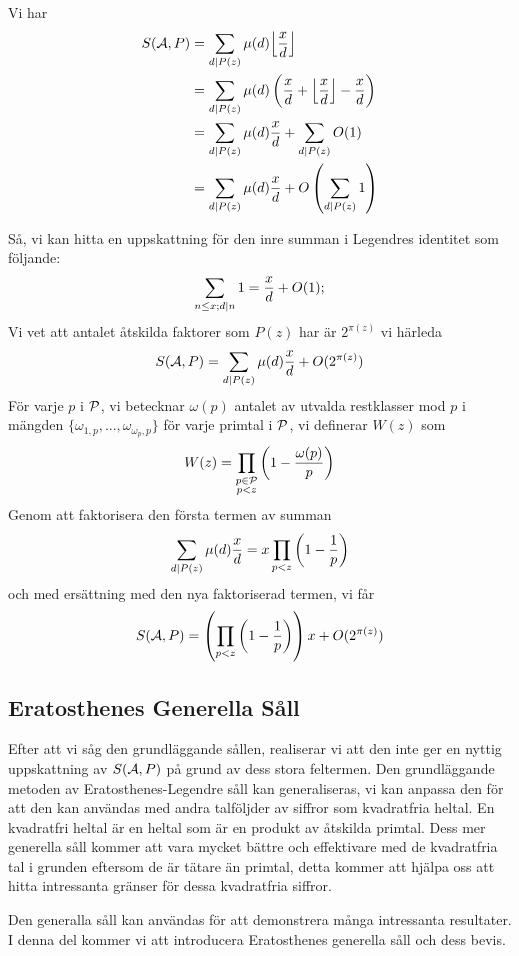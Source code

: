 Vi har
\begin{align*}
S(\A, P) & =\sum_{d\divides P(z)}\mu(d)\Bigl\lfloor \frac{x}{d}\Bigr\rfloor\\
 &  =\sum_{d\divides P(z)}\mu(d) \left( \frac{x}{d}+ \Bigl\lfloor \frac{x}{d} \Bigr\rfloor - \frac{x}{d} \right)\\
 & =\sum_{d\divides P(z)}\mu(d)\frac{x}{d}+\sum_{d\divides P(z)}O(1)\\
 & =\sum_{d\divides P(z)}\mu(d)\frac{x}{d}+ O\left(\sum_{d\divides P(z)}1\right)
\end{align*}

Så, vi kan hitta en uppskattning för den inre summan i Legendres identitet som följande:
\[\sum_{n\leq x;d\divides n}1=\frac{x}{d}+O(1); \]
Vi vet att antalet åtskilda faktorer som $ P(z) $ har är $ 2^{\pi(z)} $ vi härleda
\[S(\A, P)=\sum_{d\divides P(z)}\mu(d)\frac{x}{d}+ O(2^{\pi(z)}) \]
För varje $ p $ i $ \P $, vi betecknar $ \omega(p) $ antalet av utvalda restklasser mod $ p $ i mängden $ \lbrace \omega_{1,p},...,\omega_{\omega_{p},p}\rbrace $ för varje primtal i $ \P $, vi definerar $ W(z) $ som
\[W(z)=\prod_{\substack{p\in \P\\p<z}}\left( 1-\frac{\omega(p)}{p}\right)\]
Genom att faktorisera den första termen av summan 
\[\sum_{d\divides P(z)}\mu(d)\frac{x}{d}= x\prod_{p< z}\left( 1-\frac{1}{p} \right) \]
och med ersättning med den nya faktoriserad termen, vi får
\[S(\A, P)=\left( \prod_{p< z}\left( 1-\frac{1}{p} \right)\right) x +O(2^{\pi(z)}) \]

\subsection{Eratosthenes Generella Såll}
Efter att vi såg den grundläggande sållen, realiserar vi att den inte ger en nyttig uppskattning av $ S(\A, P) $ på grund av dess stora feltermen. Den grundläggande metoden av Eratosthenes-Legendre såll kan generaliseras, vi kan anpassa den för att den kan användas med andra talföljder av siffror som kvadratfria heltal. En kvadratfri heltal är en heltal som är en produkt av åtskilda primtal. Dess mer generella såll kommer att vara mycket bättre och effektivare med de kvadratfria tal i grunden eftersom de är tätare än primtal, detta kommer att hjälpa oss att hitta intressanta gränser för dessa kvadratfria siffror.

Den generalla såll kan användas för att demonstrera många intressanta resultater. I denna del kommer vi att introducera Eratosthenes generella såll och dess bevis.

